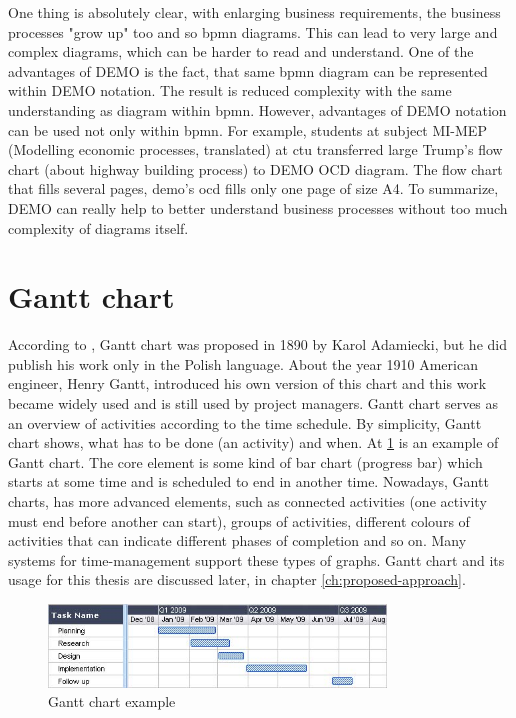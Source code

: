 One thing is absolutely clear, with enlarging business requirements, the business processes "grow up" too and so \gls{bpmn} diagrams. This can lead to very large and complex diagrams, which can be harder to read and understand. One of the advantages of DEMO is the fact, that same \gls{bpmn} diagram can be represented within DEMO notation. The result is reduced complexity with the same understanding as diagram within \gls{bpmn}. However, advantages of DEMO notation can be used not only within \gls{bpmn}. For example, students at subject MI-MEP (Modelling economic processes, translated) at \gls{ctu}\cite{ccmi-2018} transferred large Trump's flow chart\cite{quartz-trump-2017} (about highway building process) to DEMO OCD diagram. The flow chart that fills several pages, \gls{demo}'s \gls{ocd} fills only one page of size A4. 
To summarize, DEMO can really help to better understand business processes without too much complexity of diagrams itself.
\section{Gantt chart}
According to \cite{gantt-chart-2018}, Gantt chart was proposed in 1890 by Karol Adamiecki, but he did publish his work only in the Polish language. About the year 1910 American engineer, Henry Gantt, introduced his own version of this chart and this work became widely used and is still used by project managers. 
Gantt chart serves as an overview of activities according to the time schedule. By simplicity, Gantt chart shows, what has to be done (an activity) and when.
At \cref{fig:gantt-chart-example} is an example of Gantt chart. The core element is some kind of bar chart (progress bar) which starts at some time and is scheduled to end in another time.
Nowadays, Gantt charts, has more advanced elements, such as connected activities (one activity must end before another can start), groups of activities, different colours of activities that can indicate different phases of completion and so on. Many systems for time-management support these types of graphs.
Gantt chart and its usage for this thesis are discussed later, in chapter \cref{ch:proposed-approach}.

\begin{figure}[ht!]
	\centering
    \includegraphics[width=0.8\textwidth]{img/gantt-chart-example.jpg}
    \caption{Gantt chart example\cite{gantt-chart-2018}}
    \label{fig:gantt-chart-example}
\end{figure}

